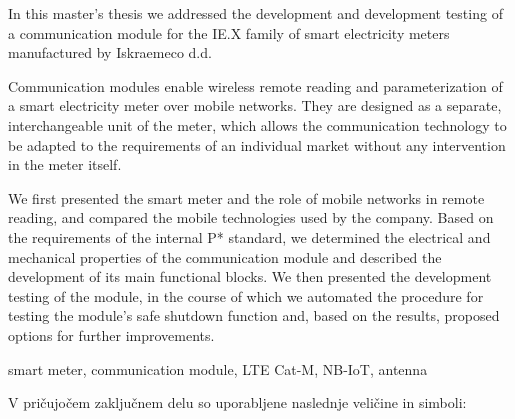 \documentclass[a4paper,twoside,openright,12pt,slovene]{book}
\begin{document}


\abstract In this master's thesis we addressed the development and development testing of a communication module for the IE.X family of smart electricity meters manufactured by Iskraemeco d.d.
\par Communication modules enable wireless remote reading and parameterization of a smart electricity meter over mobile networks. They are designed as a separate, interchangeable unit of the meter, which allows the communication technology to be adapted to the requirements of an individual market without any intervention in the meter itself.
\par We first presented the smart meter and the role of mobile networks in remote reading, and compared the mobile technologies used by the company. Based on the requirements of the internal P* standard, we determined the electrical and mechanical properties of the communication module and described the development of its main functional blocks. We then presented the development testing of the module, in the course of which we automated the procedure for testing the module's safe shutdown function and, based on the results, proposed options for further improvements.

\keywords
smart meter, communication module, LTE Cat-M, NB-IoT, antenna


\tableofcontents

\seznamslik
\seznamtabel

\seznamsimbolov
V pričujočem zaključnem delu so uporabljene naslednje veličine in simboli:
\end{document}

